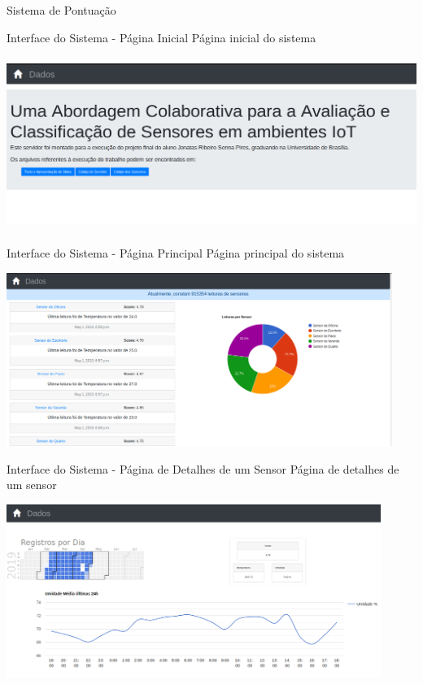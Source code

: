 \documentclass{beamer}
\begin{document}
  \begin{frame}{Sistema de Pontuação}

  \end{frame}

  \begin{frame}{Interface do Sistema - Página Inicial}
    Página inicial do sistema
    \begin{center}
    \includegraphics[height=160pt, width=\textwidth]{inicial}
    \end{center}
  \end{frame}
  \begin{frame}{Interface do Sistema - Página Principal}
    Página principal do sistema
    \begin{center}
    \includegraphics[height=160pt, width=\textwidth]{principal}
    \end{center}
  \end{frame}
  \begin{frame}{Interface do Sistema - Página de Detalhes de um Sensor}
    Página de detalhes de um sensor
    \begin{center}
    \includegraphics[height=160pt, width=\textwidth]{pSensor}
    \end{center}
  \end{frame}
\end{document}
